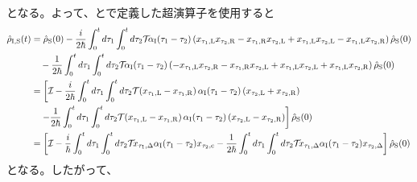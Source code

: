 \documentclass[10pt, a4paper]{jsarticle}
\begin{document}
となる。よって、とで定義した超演算子を使用すると
\begin{equation}
\begin{split}
\label{eq:511}
	\hat{\rho}_{\rm I,S}(t) &= \hat{\rho}_{\rm S}(0) - \dfrac{i}{2 \hbar} \int_{0}^{t} d\tau_{1} \int_{0}^{t} d\tau_{2} \mathcal{T}_{} \alpha_{\rm I}(\tau_{1} - \tau_{2}) \left( x_{\tau_{1}, {\rm L}} x_{\tau_{2}, {\rm R}} - x_{\tau_{1}, {\rm R}} x_{\tau_{2}, {\rm L}} + x_{\tau_{1}, {\rm L}} x_{\tau_{2}, {\rm L}} - x_{\tau_{1}, {\rm L}} x_{\tau_{2}, {\rm R}} \right) \hat{\rho}_{\rm S}(0) \\
		&\quad - \dfrac{1}{2 \hbar} \int_{0}^{t} d\tau_{1} \int_{0}^{t} d\tau_{2} \mathcal{T}_{} \alpha_{\rm I}(\tau_{1} - \tau_{2}) \left( - x_{\tau_{1}, {\rm L}} x_{\tau_{2}, {\rm R}} - x_{\tau_{1}, {\rm R}} x_{\tau_{2}, {\rm L}} + x_{\tau_{1}, {\rm L}} x_{\tau_{2}, {\rm L}} + x_{\tau_{1}, {\rm L}} x_{\tau_{2}, {\rm R}} \right) \hat{\rho}_{\rm S}(0) \\
		&= \left[ \mathcal{I}_{} - \dfrac{i}{2 \hbar} \int_{0}^{t} d\tau_{1} \int_{0}^{t} d\tau_{2} \mathcal{T}_{} \left( x_{\tau_{1}, {\rm L}} - x_{\tau_{1}, {\rm R}} \right) \alpha_{\rm I}(\tau_{1} - \tau_{2}) \left( x_{\tau_{2}, {\rm L}} + x_{\tau_{2}, {\rm R}} \right) \right. \\
		&\quad \left. - \dfrac{1}{2 \hbar} \int_{0}^{t} d\tau_{1} \int_{0}^{t} d\tau_{2} \mathcal{T}_{} \left( x_{\tau_{1}, {\rm L}} - x_{\tau_{1}, {\rm R}} \right) \alpha_{\rm I}(\tau_{1} - \tau_{2}) \left( x_{\tau_{2}, {\rm L}} - x_{\tau_{2}, {\rm R}} \right) \right] \hat{\rho}_{\rm S}(0) \\
		&= \left[ \mathcal{I}_{} - \dfrac{i}{\hbar} \int_{0}^{t} d\tau_{1} \int_{0}^{t} d\tau_{2} \mathcal{T}_{} x_{\tau_{1}, \Delta} \alpha_{\rm I}(\tau_{1} - \tau_{2}) x_{\tau_{2}, {\rm c}} - \dfrac{1}{2 \hbar} \int_{0}^{t} d\tau_{1} \int_{0}^{t} d\tau_{2} \mathcal{T}_{} x_{\tau_{1}, \Delta} \alpha_{\rm I}(\tau_{1} - \tau_{2}) x_{\tau_{2}, \Delta} \right] \hat{\rho}_{\rm S}(0) \\
\end{split}
\end{equation}
となる。したがって、
\end{document}
